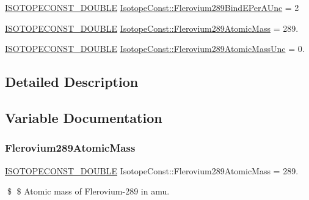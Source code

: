 \begin{DoxyCompactItemize}
\mbox{\hyperlink{group___isotope_const-_macros_ga8f45a7272ce02c0b4c65c44636ed719a}{I\+S\+O\+T\+O\+P\+E\+C\+O\+N\+S\+T\+\_\+\+D\+O\+U\+B\+LE}} \mbox{\hyperlink{group___isotope_const-_flerovium-_fl289_ga75710d41e705255c9caad4862abdda4e}{Isotope\+Const\+::\+Flerovium289\+Bind\+E\+Per\+A\+Unc}} = 2
\item 
\mbox{\hyperlink{group___isotope_const-_macros_ga8f45a7272ce02c0b4c65c44636ed719a}{I\+S\+O\+T\+O\+P\+E\+C\+O\+N\+S\+T\+\_\+\+D\+O\+U\+B\+LE}} \mbox{\hyperlink{group___isotope_const-_flerovium-_fl289_gaa9ed9c018f5282d0fd2e73b083f914ae}{Isotope\+Const\+::\+Flerovium289\+Atomic\+Mass}} = 289.
\item 
\mbox{\hyperlink{group___isotope_const-_macros_ga8f45a7272ce02c0b4c65c44636ed719a}{I\+S\+O\+T\+O\+P\+E\+C\+O\+N\+S\+T\+\_\+\+D\+O\+U\+B\+LE}} \mbox{\hyperlink{group___isotope_const-_flerovium-_fl289_ga938b66b613e06ebf26beeb4fa881f467}{Isotope\+Const\+::\+Flerovium289\+Atomic\+Mass\+Unc}} = 0.
\end{DoxyCompactItemize}


\subsection{Detailed Description}


\subsection{Variable Documentation}
\mbox{\label{group___isotope_const-_flerovium-_fl289_gaa9ed9c018f5282d0fd2e73b083f914ae}} 
\subsubsection{\texorpdfstring{Flerovium289\+Atomic\+Mass}{Flerovium289AtomicMass}}
{\footnotesize\ttfamily \mbox{\hyperlink{group___isotope_const-_macros_ga8f45a7272ce02c0b4c65c44636ed719a}{I\+S\+O\+T\+O\+P\+E\+C\+O\+N\+S\+T\+\_\+\+D\+O\+U\+B\+LE}} Isotope\+Const\+::\+Flerovium289\+Atomic\+Mass = 289.}

\$ \$ Atomic mass of Flerovium-\/289 in amu. \mbox{\label{group___isotope_const-_flerovium-_fl289_ga938b66b613e06ebf26beeb4fa881f467}} 
